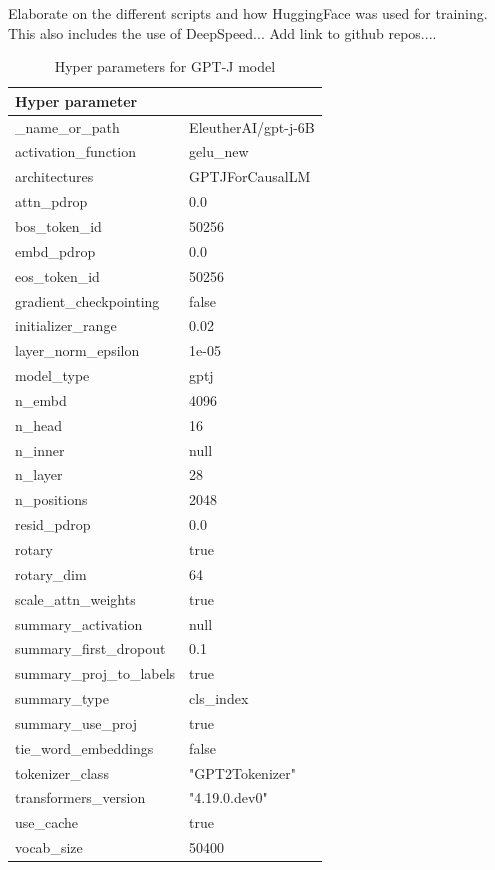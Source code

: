 Elaborate on the different scripts and how HuggingFace was used for training. This  also includes the use of DeepSpeed...
Add link to github repos....

\begin{table}
    \def\arraystretch{1.5}
    \small
    \centering
    \caption{Hyper parameters for GPT-J model}
    \label{tab:inclusion-exclusion-criteria}
    \begin{tabularx}{\textwidth}{XX}
        \toprule
        \textbf{Hyper parameter} & \\
        \midrule
        \_name\_or\_path & EleutherAI/gpt-j-6B\\
        activation\_function & gelu\_new\\
        architectures & GPTJForCausalLM\\
        attn\_pdrop & 0.0\\
        bos\_token\_id & 50256\\
        embd\_pdrop & 0.0\\
        eos\_token\_id & 50256\\
        gradient\_checkpointing & false\\
        initializer\_range & 0.02\\
        layer\_norm\_epsilon & 1e-05\\
        model\_type & gptj\\
        n\_embd & 4096\\
        n\_head & 16\\
        n\_inner & null\\
        n\_layer & 28\\
        n\_positions & 2048\\
        resid\_pdrop & 0.0\\
        rotary & true\\
        rotary\_dim & 64\\
        scale\_attn\_weights & true\\
        summary\_activation & null\\
        summary\_first\_dropout & 0.1\\
        summary\_proj\_to\_labels & true\\
        summary\_type & cls\_index\\
        summary\_use\_proj & true\\
        tie\_word\_embeddings & false\\
        tokenizer\_class & "GPT2Tokenizer"\\
        transformers\_version & "4.19.0.dev0"\\
        use\_cache & true\\
        vocab\_size & 50400\\
        \bottomrule
    \end{tabularx}
\end{table}



